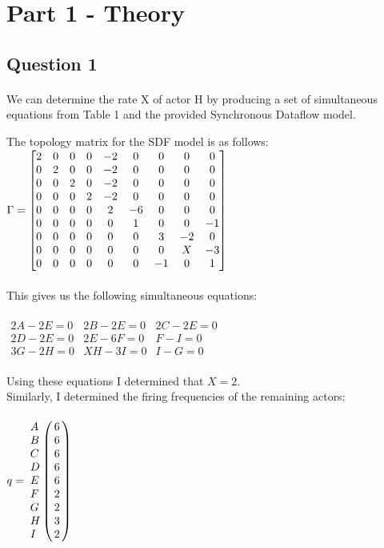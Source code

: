 \documentclass[12pt]{article} %
\begin{document}
\section{Part 1 - Theory} %


\subsection{Question 1} %

\paragraph{}
We can determine the rate X of actor H by producing a set of simultaneous equations from Table 1 and the provided Synchronous Dataflow model.

The topology matrix for the SDF model is as follows:
\\

$
\Gamma = \begin{bmatrix}
		2 & 0 & 0 & 0 & -2 & 0 & 0 & 0 & 0 \cr
		0 & 2 & 0 & 0 & -2 & 0 & 0 & 0 & 0 \cr
		0 & 0 & 2 & 0 & -2 & 0 & 0 & 0 & 0 \cr
		0 & 0 & 0 & 2 & -2 & 0 & 0 & 0 & 0 \cr
		0 & 0 & 0 & 0 & 2 & -6 & 0 & 0 & 0 \cr
		0 & 0 & 0 & 0 & 0 & 1 & 0 & 0 & -1 \cr
		0 & 0 & 0 & 0 & 0 & 0 & 3 & -2 & 0 \cr
		0 & 0 & 0 & 0 & 0 & 0 & 0 & X & -3 \cr
		0 & 0 & 0 & 0 & 0 & 0 & -1 & 0 & 1 \cr
		\end{bmatrix}
$
\\ \\
This gives us the following simultaneous equations:
\\ \\
$
\begin{matrix}
2A - 2E = 0 & 2B - 2E = 0 & 2C - 2E = 0 \\
2D - 2E = 0 & 2E - 6F = 0 & F - I = 0 \\
3G - 2H = 0 & XH - 3I = 0 & I - G = 0
\end{matrix}
$
\\ \\
Using these equations I determined that $X = 2$. \\ Similarly, I determined the firing frequencies of the remaining actors:
\\
$
q = \bordermatrix{~ & ~ \cr
				A & 6 \cr
				B & 6 \cr
				C & 6 \cr
				D & 6 \cr
				E & 6 \cr
				F & 2 \cr
				G & 2 \cr
				H & 3 \cr
				I & 2 \cr}	
$


\end{document}
